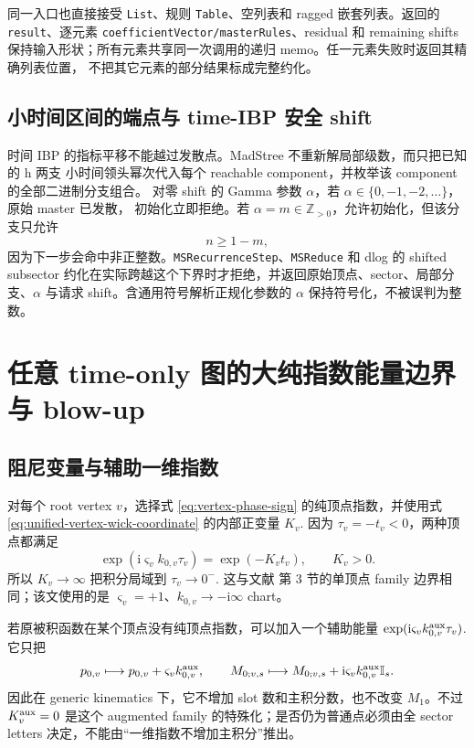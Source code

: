 \documentclass[11pt,a4paper]{ctexart}
\newcommand{\ii}{\mathrm i}
\newcommand{\Id}{\mathbb I}
\begin{document}
同一入口也直接接受 \texttt{List}、规则 \texttt{Table}、空列表和 ragged 嵌套列表。返回的
\texttt{result}、逐元素 \texttt{coefficientVector/masterRules}、residual 和 remaining shifts
保持输入形状；所有元素共享同一次调用的递归 memo。任一元素失败时返回其精确列表位置，
不把其它元素的部分结果标成完整约化。

\subsection{小时间区间的端点与 time-IBP 安全 shift}
\label{sec:time-ibp-domain}

时间 IBP 的指标平移不能越过发散点。MadStree 不重新解局部级数，而只把已知的 h 两支
小时间领头幂次代入每个 reachable component，并枚举该 component 的全部二进制分支组合。
对零 shift 的 Gamma 参数 $\alpha$，若 $\alpha\in\{0,-1,-2,\ldots\}$，原始 master 已发散，
初始化立即拒绝。若 $\alpha=m\in\mathbb Z_{>0}$，允许初始化，但该分支只允许
\begin{equation}
 n\geq 1-m,
\end{equation}
因为下一步会命中非正整数。\texttt{MSRecurrenceStep}、\texttt{MSReduce} 和 dlog 的 shifted
subsector 约化在实际跨越这个下界时才拒绝，并返回原始顶点、sector、局部分支、$\alpha$ 与请求
shift。含通用符号解析正规化参数的 $\alpha$ 保持符号化，不被误判为整数。

\section{任意 time-only 图的大纯指数能量边界与 blow-up}
\label{sec:boundary-blowup}

\subsection{阻尼变量与辅助一维指数}

对每个 root vertex $v$，选择式 \eqref{eq:vertex-phase-sign} 的纯顶点指数，并使用式 \eqref{eq:unified-vertex-wick-coordinate} 的内部正变量 $K_v$. 因为 $\tau_v=-t_v<0$，两种顶点都满足
\begin{equation}
 \exp(\ii\varsigma_vk_{0,v}\tau_v)=\exp(-K_vt_v),
 \qquad K_v>0.
 \label{eq:wick-damping-energy}
\end{equation}
所以 $K_v\to\infty$ 把积分局域到 $\tau_v\to0^-$. 这与文献 \cite{Chen:2024jms} 第 3 节的单顶点 family 边界相同；该文使用的是 $\varsigma_v=+1$、$k_{0,v}\to-\ii\infty$ chart。

若原被积函数在某个顶点没有纯顶点指数，可以加入一个辅助能量 $\exp(\ii\varsigma_vk_{0,v}^{\rm aux}\tau_v)$. 它只把
\begin{equation}
 p_{0,v}\longmapsto p_{0,v}+\varsigma_vk_{0,v}^{\rm aux},
 \qquad
 M_{0;v,s}\longmapsto M_{0;v,s}
 +\ii\varsigma_vk_{0,v}^{\rm aux}\Id_s .
 \label{eq:auxiliary-energy-M0-shift}
\end{equation}
因此在 generic kinematics 下，它不增加 slot 数和主积分数，也不改变 $M_1$。不过 $K_v^{\rm aux}=0$ 是这个 augmented family 的特殊化；是否仍为普通点必须由全 sector letters 决定，不能由“一维指数不增加主积分”推出。
\end{document}
